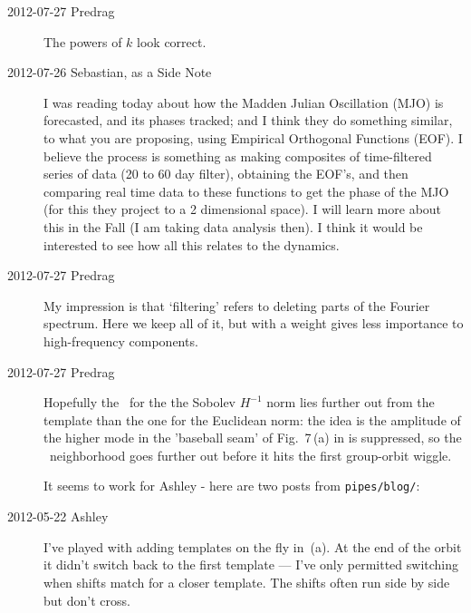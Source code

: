 \begin{description}
\item[2012-07-27 Predrag] The powers of $k$ look correct.

\item[2012-07-26 Sebastian, as a Side Note]  I was reading today about
how the Madden Julian Oscillation (MJO) is forecasted, and its phases
tracked; and I think they do something similar, to what you are
proposing, using Empirical Orthogonal Functions (EOF). I believe the
process is something as making composites of time-filtered series of data
(20 to 60 day filter), obtaining the EOF's, and then comparing real time
data to these functions to get the phase of the MJO (for this they
project to a 2 dimensional space). I will learn more about this in the
Fall (I am taking data analysis then). I think it would be interested to
see how all this relates to the dynamics.

\item[2012-07-27 Predrag] My impression is that `filtering' refers to
deleting parts of the Fourier spectrum. Here we keep all of it, but with
a weight gives less importance to high-frequency components.

\item[2012-07-27 Predrag]                       \toCB
Hopefully the \chartBord\ for the the Sobolev $H^{-1}$ norm lies further out from the
template than the one for the Euclidean norm: the idea is the amplitude
of the higher mode in the 'baseball seam' of Fig.~7\,(a) in
{} is suppressed, so the \template\ neighborhood goes
further out before it hits the first group-orbit wiggle.

It seems to work for Ashley - here are two posts from
\texttt{pipes/blog/}:

\item[2012-05-22 Ashley]
 I've played with adding templates on the fly in
 \,(a).  At the end of the orbit
 it didn't switch back to the first template --- I've only permitted
 switching when shifts match for a closer template.  The shifts
 often run side by side but don't cross.


\end{description}
